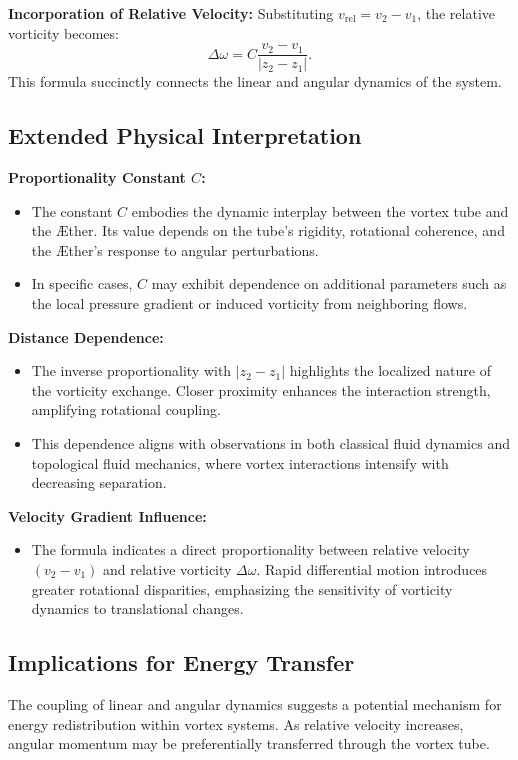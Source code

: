 \documentclass[12pt]{article}
\begin{document}
    \textbf{Incorporation of Relative Velocity:} Substituting $v_\text{rel} = v_2 - v_1$, the relative vorticity becomes:
    \begin{equation*}
        \Delta \omega = C \frac{v_2 - v_1}{|z_2 - z_1|}.
    \end{equation*}
    This formula succinctly connects the linear and angular dynamics of the system.

    \subsection*{Extended Physical Interpretation}
    \textbf{Proportionality Constant $C$:}
    \begin{itemize}
        \item The constant $C$ embodies the dynamic interplay between the vortex tube and the Æther. Its value depends on the tube's rigidity, rotational coherence, and the Æther's response to angular perturbations.
        \item In specific cases, $C$ may exhibit dependence on additional parameters such as the local pressure gradient or induced vorticity from neighboring flows.
    \end{itemize}

    \textbf{Distance Dependence:}
    \begin{itemize}
        \item The inverse proportionality with $|z_2 - z_1|$ highlights the localized nature of the vorticity exchange. Closer proximity enhances the interaction strength, amplifying rotational coupling.
        \item This dependence aligns with observations in both classical fluid dynamics and topological fluid mechanics, where vortex interactions intensify with decreasing separation.
    \end{itemize}

    \textbf{Velocity Gradient Influence:}
    \begin{itemize}
        \item The formula indicates a direct proportionality between relative velocity $(v_2 - v_1)$ and relative vorticity $\Delta \omega$. Rapid differential motion introduces greater rotational disparities, emphasizing the sensitivity of vorticity dynamics to translational changes.
    \end{itemize}

    \subsection*{Implications for Energy Transfer}
    The coupling of linear and angular dynamics suggests a potential mechanism for energy redistribution within vortex systems. As relative velocity increases, angular momentum may be preferentially transferred through the vortex tube.
\end{document}
